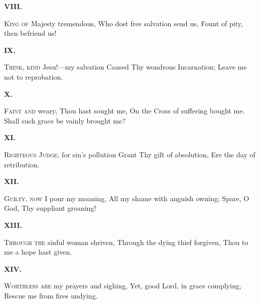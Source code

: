 \documentclass[fontsize=9, a5paper]{scrbook}
\begin{document}
\begin{volumetitlepage}
\begin{poem}
		\begin{stanza}
			\textbf{VIII.}\verseline
			
			\textsc{King of} Majesty tremendous,\verseline
			Who dost free salvation send us,\verseline
			Fount of pity, then befriend us! 
		\end{stanza}
	
		\begin{stanza}
			\textbf{IX.}\verseline
			
			\textsc{Think, kind} Jesu!—my salvation\verseline
			Caused Thy wondrous Incarnation;\verseline
			Leave me not to reprobation. 
		\end{stanza}
	
		\begin{stanza}
			\textbf{X.}\verseline
			
			\textsc{Faint and} weary, Thou hast sought me,\verseline
			On the Cross of suffering bought me.\verseline
			Shall such grace be vainly brought me? 
		\end{stanza}
	
		\begin{stanza}
			\textbf{XI.}\verseline
			
			\textsc{Righteous Judge,} for sin's pollution\verseline
			Grant Thy gift of absolution,\verseline
			Ere the day of retribution. 
		\end{stanza}
	
		\begin{stanza}
			\textbf{XII.}\verseline
			
			\textsc{Guilty, now} I pour my moaning,\verseline
			All my shame with anguish owning;\verseline
			Spare, O God, Thy suppliant groaning! 
		\end{stanza}
	
		\begin{stanza}
			\textbf{XIII.}\verseline
			
			\textsc{Through the} sinful woman shriven,\verseline
			Through the dying thief forgiven,\verseline
			Thou to me a hope hast given. 
		\end{stanza}
		
		\pagebreak
	
		\begin{stanza}
			\textbf{XIV.}\verseline
			
			\textsc{Worthless are} my prayers and sighing,\verseline
			Yet, good Lord, in grace complying,\verseline
			Rescue me from fires undying. 
		\end{stanza}
	

\end{poem}
\end{volumetitlepage}
\end{document}
